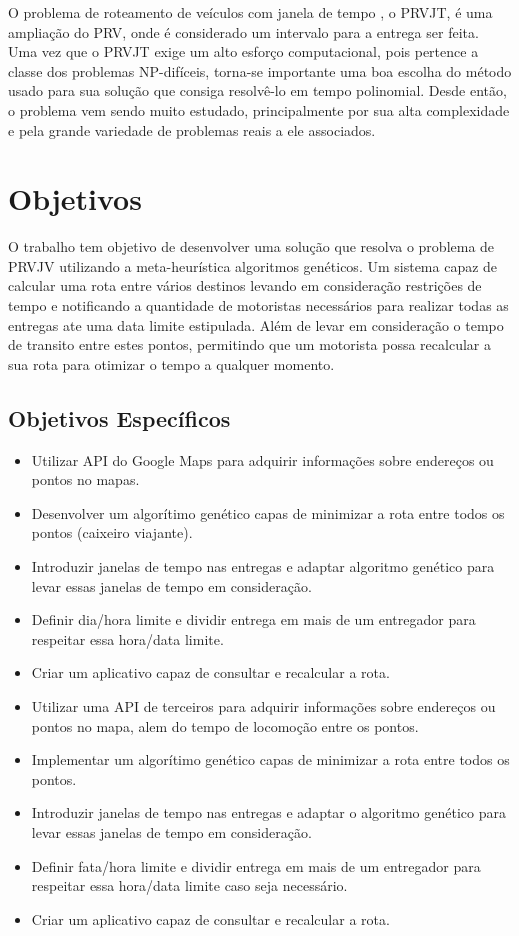O problema de roteamento de veículos com janela de tempo , o PRVJT, é uma ampliação do PRV, onde é considerado um intervalo para a entrega ser feita.
Uma vez que o PRVJT exige um alto esforço computacional, pois pertence a classe dos problemas NP-difíceis, torna-se importante uma boa escolha do método usado para sua solução que consiga resolvê-lo em tempo polinomial.
Desde então, o problema vem sendo muito estudado, principalmente por sua alta complexidade e pela grande variedade de problemas reais a ele associados.

\section{Objetivos}

O trabalho tem objetivo de desenvolver uma solução que resolva o problema de PRVJV utilizando a meta-heurística algoritmos genéticos. Um sistema capaz de calcular uma rota entre vários destinos 
levando em consideração restrições de tempo e notificando a quantidade de motoristas necessários para realizar todas as entregas ate uma data limite estipulada. Além de levar  
em consideração o tempo de transito entre estes pontos, permitindo que um motorista possa recalcular a sua rota para otimizar o tempo a qualquer momento.

\subsection{Objetivos Específicos}

\begin{itemize}
	\item Utilizar API do Google Maps para adquirir informações sobre endereços ou pontos no mapas.
	\item Desenvolver um algorítimo genético capas de minimizar a rota entre todos os pontos (caixeiro viajante).
	\item Introduzir janelas de tempo nas entregas e adaptar algoritmo genético para levar essas janelas de tempo em consideração.
	\item Definir dia/hora limite e dividir entrega em mais de um entregador para respeitar essa hora/data limite.
	\item Criar um aplicativo capaz de consultar e recalcular a rota.
	\item Utilizar uma API de terceiros para adquirir informações sobre endereços ou pontos no mapa, alem do tempo de locomoção entre os pontos.
	\item Implementar um algorítimo genético capas de minimizar a rota entre todos os pontos.
	\item Introduzir janelas de tempo nas entregas e adaptar o algoritmo genético para levar essas janelas de tempo em consideração.
	\item Definir fata/hora limite e dividir entrega em mais de um entregador para respeitar essa hora/data limite caso seja necessário.
	\item Criar um aplicativo capaz de consultar e recalcular a rota.
\end{itemize}

